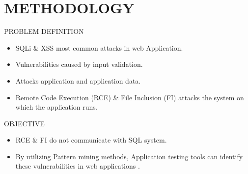 \documentclass[xcolor=x11names,compress]{beamer}
\renewcommand{\(}{\begin{columns}}
\renewcommand{\)}{\end{columns}}
\newcommand{\<}[1]{\begin{column}{#1}}
\renewcommand{\>}{\end{column}}
\begin{document}
\section{\scshape METHODOLOGY}
\begin{frame}
\end{frame}
\begin{frame}{PROBLEM DEFINITION}
	\begin{itemize}
		
		\item SQLi \& XSS most common attacks in web Application.\newline
		\item Vulnerabilities caused by input validation.\newline
		\item Attacks application and application data.\newline
		\item Remote Code Execution (RCE) \& File Inclusion (FI) attacks the system on which the application runs.\newline
		
		
	\end{itemize}
\end{frame}
\begin{frame}{OBJECTIVE}
	\begin{itemize}
		\item RCE \& FI do not communicate with SQL system.\newline
		
		\item By utilizing Pattern mining methods, Application testing tools can identify these vulnerabilities in web applications .
	\end{itemize}
\end{frame}
\end{document}
